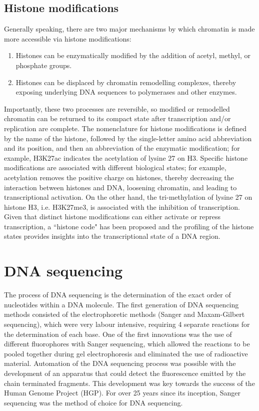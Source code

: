 \subsection{Histone modifications}

Generally speaking, there are two major mechanisms by which chromatin is made more accessible via histone modifications:

\begin{enumerate}
   \item Histones can be enzymatically modified by the addition of acetyl, methyl, or phosphate groups.
   \item Histones can be displaced by chromatin remodelling complexes, thereby exposing underlying DNA sequences to polymerases and other enzymes.
\end{enumerate}

Importantly, these two processes are reversible, so modified or remodelled chromatin can be returned to its compact state after transcription and/or replication are complete. The nomenclature for histone modifications is defined by the name of the histone, followed by the single-letter amino acid abbreviation and its position, and then an abbreviation of the enzymatic modification; for example, H3K27ac indicates the acetylation of lysine 27 on H3. Specific histone modifications are associated with different biological states; for example, acetylation removes the positive charge on histones, thereby decreasing the interaction between histones and DNA, loosening chromatin, and leading to transcriptional activation. On the other hand, the tri-methylation of lysine 27 on histone H3, i.e. H3K27me3, is associated with the inhibition of transcription\cite{pmid21652639}. Given that distinct histone modifications can either activate or repress transcription, a ``histone code" has been proposed\cite{pmid11498575} and the profiling of the histone states provides insights into the transcriptional state of a DNA region.

\section{DNA sequencing}

The process of DNA sequencing is the determination of the exact order of nucleotides within a DNA molecule. The first generation of DNA sequencing methods consisted of the electrophoretic methods (Sanger and Maxam-Gilbert sequencing), which were very labour intensive, requiring 4 separate reactions for the determination of each base. One of the first innovations was the use of different fluorophores with Sanger sequencing, which allowed the reactions to be pooled together during gel electrophoresis and eliminated the use of radioactive material. Automation of the DNA sequencing process was possible with the development of an apparatus that could detect the fluorescence emitted by the chain terminated fragments. This development was key towards the success of the Human Genome Project (HGP). For over 25 years since its inception, Sanger sequencing was the method of choice for DNA sequencing.

